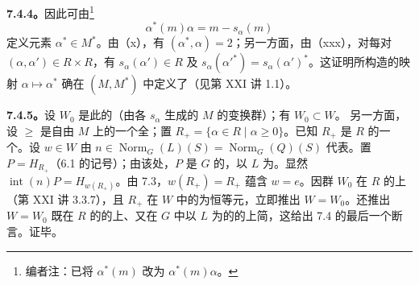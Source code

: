 \textbf{7.4.4。}因此可由\footnote{编者注：已将 $\alpha^*(m)$ 改为 $\alpha^*(m)\alpha$。}
\[
 \alpha^*(m)\alpha=m-s_\alpha(m)
\]
定义元素 $\alpha^*\in M^*$。由（x），有 $(\alpha^*,\alpha)=2$；另一方面，由（xxx），对每对 $(\alpha,\alpha')\in R\times R$，有 $s_\alpha(\alpha')\in R$ 及 $s_\alpha(\alpha'^*)=s_\alpha(\alpha')^*$。这证明所构造的映射 $\alpha\mapsto\alpha^*$ 确在 $(M,M^*)$ 中定义了（见第 XXI 讲 1.1）。

\textbf{7.4.5。}设 $W_0$ 是此的（由各 $s_\alpha$ 生成的 $M$ 的变换群）；有 $W_0\subset W$。
另一方面，设 $\geq$ 是自由 $M$ 上的一个全；置 $R_+=\{\alpha\in R\mid\alpha\geq0\}$。已知 $R_+$ 是 $R$ 的一个。设 $w\in W$ 由 $n\in\operatorname{Norm}_G(L)(S)=\operatorname{Norm}_G(Q)(S)$ 代表。置 $P=H_{R_+}$（6.1 的记号）；由该处，$P$ 是 $G$ 的，以 $L$ 为。显然 $\operatorname{int}(n)P=H_{w(R_+)}$。由 7.3，$w(R_+)=R_+$ 蕴含 $w=e$。因群 $W_0$ 在 $R$ 的上（第 XXI 讲 3.3.7），且 $R_+$ 在 $W$ 中的为恒等元，立即推出 $W=W_0$。还推出 $W=W_0$ 既在 $R$ 的的上、又在 $G$ 中以 $L$ 为的的上简，这给出 7.4 的最后一个断言。证毕。

